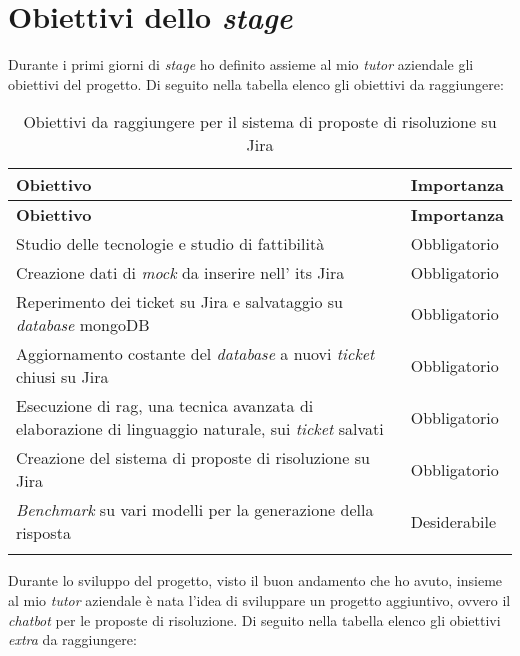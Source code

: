 \section{Obiettivi dello \textit{stage}}
Durante i primi giorni di \textit{stage} ho definito assieme al mio \textit{tutor} aziendale gli obiettivi del progetto.
Di seguito nella tabella elenco gli obiettivi da raggiungere:
\renewcommand{\arraystretch}{2}
\begin{longtable}{|p{10cm}|p{2cm}|}
    \hline
    \rowcolor{tableheader}\textbf{Obiettivo} & \textbf{Importanza} \\
    \hline
    \endfirsthead

    \rowcolor{tableheader}\textbf{Obiettivo} & \textbf{Importanza} \\
    \hline
    \endhead

    \hline
    \endfoot

    \hline
    \endlastfoot
    \rowcolor{tableoddrow} Studio delle tecnologie e studio di fattibilità & Obbligatorio \\
    \hline
    \rowcolor{tableevenrow} Creazione dati di \textit{mock} da inserire nell' \gls{its} Jira & Obbligatorio \\
    \hline
    \rowcolor{tableoddrow} Reperimento dei ticket su Jira e salvataggio su \textit{database} mongoDB & Obbligatorio \\
    \hline
    \rowcolor{tableoddrow} Aggiornamento costante del \textit{database} a nuovi \textit{ticket} chiusi su Jira & Obbligatorio \\
    \hline
    \rowcolor{tableoddrow} Esecuzione di \gls{rag}, una tecnica avanzata di elaborazione di linguaggio naturale, sui \textit{ticket} salvati & Obbligatorio \\
    \hline
    \rowcolor{tableoddrow} Creazione del sistema di proposte di risoluzione su Jira & Obbligatorio \\
    \hline
    \rowcolor{tableoddrow} \textit{Benchmark} su vari modelli per la generazione della risposta & Desiderabile \\
    \hline
    \caption{Obiettivi da raggiungere per il sistema di proposte di risoluzione su Jira}
    \label{tab:obiettiviJira}
\end{longtable}
\noindent
Durante lo sviluppo del progetto, visto il buon andamento che ho avuto, insieme al mio \textit{tutor} aziendale è nata l'idea di sviluppare un progetto aggiuntivo, ovvero il \textit{chatbot} per le proposte di risoluzione.
Di seguito nella tabella elenco gli obiettivi \textit{extra} da raggiungere:
